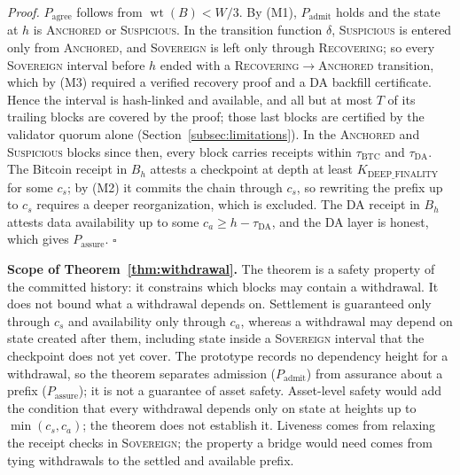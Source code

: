 \emph{Proof.} $P_{\text{agree}}$ follows from $\operatorname{wt}(B) < W/3$. By (M1), $P_{\text{admit}}$ holds and the state
at $h$ is \textsc{Anchored} or \textsc{Suspicious}. In the transition
function $\delta$, \textsc{Suspicious} is entered only from
\textsc{Anchored}, and \textsc{Sovereign} is left only through
\textsc{Recovering}; so every \textsc{Sovereign} interval before $h$ ended
with a \textsc{Recovering}$\to$\textsc{Anchored} transition, which by (M3)
required a verified recovery proof and a DA backfill certificate. Hence the
interval is hash-linked and available, and all but at most $T$ of its trailing
blocks are covered by the proof; those last blocks are certified by the validator
quorum alone (Section~\ref{subsec:limitations}). In the \textsc{Anchored} and
\textsc{Suspicious} blocks since then, every block carries receipts within
$\tau_{\text{BTC}}$ and $\tau_{\text{DA}}$. The Bitcoin receipt in $B_h$ attests a checkpoint at depth at least
$K_{\text{DEEP\_FINALITY}}$ for some $c_s$; by (M2) it
commits the chain through $c_s$, so rewriting the prefix up to $c_s$
requires a deeper reorganization, which is excluded. The DA receipt in $B_h$
attests data availability up to some $c_a \geq h - \tau_{\text{DA}}$, and the DA layer
is honest, which gives $P_{\text{assure}}$. $\square$

\textbf{Scope of Theorem~\ref{thm:withdrawal}.} The theorem is a safety
property of the committed history: it constrains which blocks may contain a
withdrawal. It does not bound what a withdrawal depends on. Settlement is
guaranteed only through $c_s$ and availability only through $c_a$, whereas a
withdrawal may depend on state created after them, including state inside a
\textsc{Sovereign} interval that the checkpoint does not yet cover. The
prototype records no dependency height for a withdrawal, so the theorem
separates admission ($P_{\text{admit}}$) from assurance about a prefix
($P_{\text{assure}}$); it is not a guarantee of asset safety. Asset-level
safety would add the condition that every withdrawal depends only on state at
heights up to $\min(c_s, c_a)$; the theorem does not establish it. Liveness
comes from relaxing the receipt checks in \textsc{Sovereign}; the property a
bridge would need comes from tying withdrawals to the settled and available
prefix.

